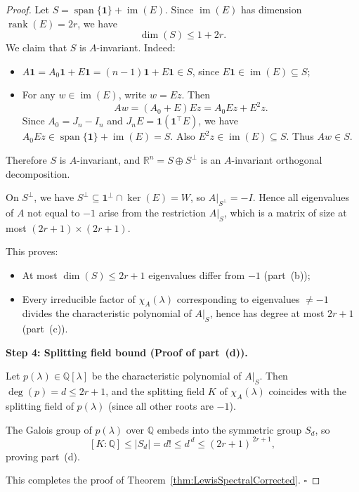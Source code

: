 \documentclass[11pt]{amsart}
\begin{document}
\begin{proof}
Let $S = \operatorname{span}\{\mathbf{1}\} + \operatorname{im}(E)$. Since $\operatorname{im}(E)$ has dimension $\operatorname{rank}(E) = 2r$, we have
\[
\dim(S) \leq 1 + 2r.
\]
We claim that $S$ is $A$-invariant. Indeed:
\begin{itemize}
    \item $A\mathbf{1} = A_0\mathbf{1} + E\mathbf{1} = (n-1)\mathbf{1} + E\mathbf{1} \in S$, since $E\mathbf{1} \in \operatorname{im}(E) \subseteq S$;
    \item For any $w \in \operatorname{im}(E)$, write $w = Ez$. Then
    \[
    Aw = (A_0 + E)Ez = A_0 Ez + E^2 z.
    \]
    Since $A_0 = J_n - I_n$ and $J_n E = \mathbf{1}(\mathbf{1}^\top E)$, we have $A_0 Ez \in \operatorname{span}\{\mathbf{1}\} + \operatorname{im}(E) = S$. Also $E^2 z \in \operatorname{im}(E) \subseteq S$. Thus $Aw \in S$.
\end{itemize}
Therefore $S$ is $A$-invariant, and $\mathbb{R}^n = S \oplus S^\perp$ is an $A$-invariant orthogonal decomposition.

On $S^\perp$, we have $S^\perp \subseteq \mathbf{1}^\perp \cap \ker(E) = W$, so $A|_{S^\perp} = -I$. Hence all eigenvalues of $A$ not equal to $-1$ arise from the restriction $A|_S$, which is a matrix of size at most $(2r+1) \times (2r+1)$.

This proves:
\begin{itemize}
    \item At most $\dim(S) \leq 2r+1$ eigenvalues differ from $-1$ (part~\textup{(b)});
    \item Every irreducible factor of $\chi_A(\lambda)$ corresponding to eigenvalues $\neq -1$ divides the characteristic polynomial of $A|_S$, hence has degree at most $2r+1$ (part~\textup{(c)}).
\end{itemize}

\medskip
\noindent\textbf{Step 4: Splitting field bound (Proof of part~\textup{(d)}).}

Let $p(\lambda) \in \mathbb{Q}[\lambda]$ be the characteristic polynomial of $A|_S$. Then $\deg(p) = d \leq 2r+1$, and the splitting field $K$ of $\chi_A(\lambda)$ coincides with the splitting field of $p(\lambda)$ (since all other roots are $-1$).

The Galois group of $p(\lambda)$ over $\mathbb{Q}$ embeds into the symmetric group $S_d$, so
\[
[K:\mathbb{Q}] \leq |S_d| = d! \leq d^{\,d} \leq (2r+1)^{\,2r+1},
\]
proving part~\textup{(d)}.

\medskip
This completes the proof of Theorem~\ref{thm:LewisSpectralCorrected}. \hfill $\square$
\end{proof}
\end{document}
